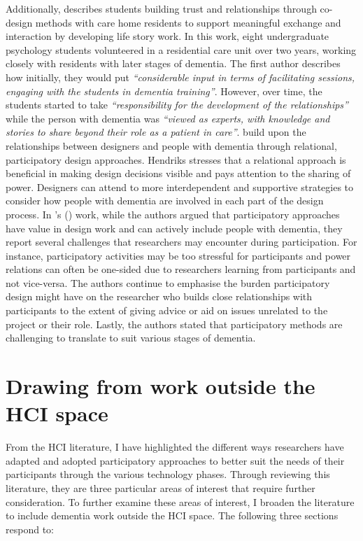 Additionally, \cite{foley_student_2020} describes students building trust and relationships through co-design methods with care home residents to support meaningful exchange and interaction by developing life story work. In this work, eight undergraduate psychology students volunteered in a residential care unit over two years, working closely with residents with later stages of dementia. The first author describes how initially, they would put \textit{``considerable input in terms of facilitating sessions, engaging with the students in dementia training''}. However, over time, the students started to take \textit{``responsibility for the development of the relationships''} while the person with dementia was \textit{``viewed as experts, with knowledge and stories to share beyond their role as a patient in care''\citep[p.9]{foley_student_2020}}. \cite{hendriks_valuing_2018} build upon the relationships between designers and people with dementia through relational, participatory design approaches. Hendriks stresses that a relational approach is beneficial in making design decisions visible and pays attention to the sharing of power. Designers can attend to more interdependent and supportive strategies to consider how people with dementia are involved in each part of the design process. In \citeauthor{hendriks_challenges_2014}'s (\citeyear{hendriks_challenges_2014}) work, while the authors argued that participatory approaches have value in design work and can actively include people with dementia, they report several challenges that researchers may encounter during participation. For instance, participatory activities may be too stressful for participants and power relations can often be one-sided due to researchers learning from participants and not vice-versa. The authors continue to emphasise the burden participatory design might have on the researcher who builds close relationships with participants to the extent of giving advice or aid on issues unrelated to the project or their role. Lastly, the authors stated that participatory methods are challenging to translate to suit various stages of dementia.

\section{Drawing from work outside the HCI space}
\label{BL:Outside-HCI}
From the HCI literature, I have highlighted the different ways researchers have adapted and adopted participatory approaches to better suit the needs of their participants through the various technology phases. Through reviewing this literature, they are three particular areas of interest that require further consideration. To further examine these areas of interest, I broaden the literature to include dementia work outside the HCI space. The following three sections respond to:

